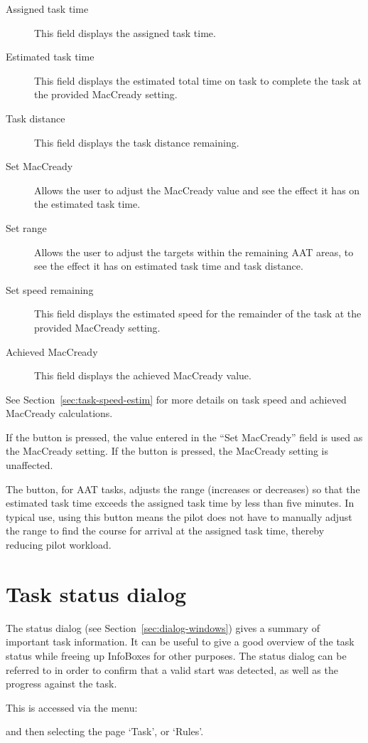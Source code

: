 \documentclass[a4paper,12pt]{refrep}
\begin{document}
\begin{description}
\item[Assigned task time]  This field displays the assigned task time.
\item[Estimated task time]  This field displays the estimated total time 
 on task to complete the task at the provided MacCready setting.
\item[Task distance]  This field displays the task distance remaining.
\item[Set MacCready]  Allows the user to adjust the MacCready value and 
 see the effect it has on the estimated task time.
\item[Set range]  Allows the user to adjust the targets within the remaining 
 AAT areas, to see the effect it has on estimated task time and task distance.
\item[Set speed remaining]  This field displays the estimated speed for the
 remainder of the task at the provided MacCready setting.
\item[Achieved MacCready]  This field displays the achieved MacCready value.
\end{description}
See Section~\ref{sec:task-speed-estim} for more details on task speed
and achieved MacCready calculations.

If the  button is pressed, the value entered in the ``Set
MacCready'' field is used as the MacCready setting.  If the
 button is pressed, the MacCready setting is
unaffected.

The  button, for AAT tasks, adjusts the range
(increases or decreases) so that the estimated task time exceeds the
assigned task time by less than five minutes.  In typical use, using
this button means the pilot does not have to manually adjust the range
to find the course for arrival at the assigned task time, thereby
reducing pilot workload.

\section{Task status dialog}

The status dialog (see Section~\ref{sec:dialog-windows}) gives a
summary of important task information.  It can be useful to give a
good overview of the task status while freeing up InfoBoxes for other
purposes.  The status dialog can be referred to in order to confirm
that a valid start was detected, as well as the progress against the
task.

This is accessed via the menu:
\begin{quote}
\blink{}
\end{quote}
and then selecting the page `Task', or `Rules'.
\end{document}
